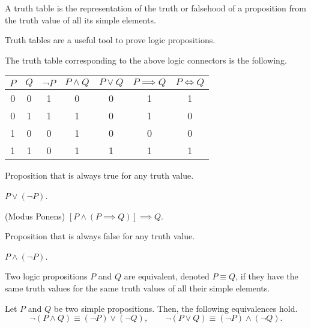 \begin{defn}
    A truth table is the representation of the truth or falsehood of a proposition from the truth value of
    all its simple elements.
\end{defn}

\noindent Truth tables are a useful tool to prove logic propositions.

\begin{example}
    The truth table corresponding to the above logic connectors is the following.
\end{example}
\begin{longtable}[c]{c|c|c|c|c|c|c}
    $P$ & $Q$ & $\neg P$ & $P\land Q$ & $P\lor Q$ & $P\implies Q$ & $P\iff Q$ \\ \hline
    0 & 0 & 1 & 0 & 0 & 1 & 1 \\
    0 & 1 & 1 & 1 & 0 & 1 & 0 \\
    1 & 0 & 0 & 1 & 0 & 0 & 0 \\
    1 & 1 & 0 & 1 & 1 & 1 & 1 \\
\end{longtable}

\begin{defn}[Tautology]\label{def:tautology}
    Proposition that is always true for any truth value. 
\end{defn}

\begin{example}
$P\lor\left(\neg P\right)$.
\end{example}

\begin{example}
    (Modus Ponens) $[P\land \left(P\implies Q\right)]\implies Q$.
\end{example}

\begin{defn}[Contradiction]\label{def:contradiction}
    Proposition that is always false for any truth value. 
\end{defn}

\begin{example}
$P\land\left(\neg P\right)$.
\end{example}

\begin{defn}
    Two logic propositions $P$ and $Q$ are equivalent, denoted $P\equiv Q$, if they have the same truth values 
    for the same truth values of all their simple elements. 
\end{defn}

\begin{prop}\label{prop:de-morgan-law-logic}
    Let $P$ and $Q$ be two simple propositions. Then, the following equivalences hold.
    \begin{equation}
        \neg\left(P\land Q\right)\equiv\left(\neg P\right)\lor\left(\neg Q\right),\quad\quad\neg\left(P\lor Q\right)
        \equiv\left(\neg P\right)\land\left(\neg Q\right).
    \end{equation}
\end{prop}

